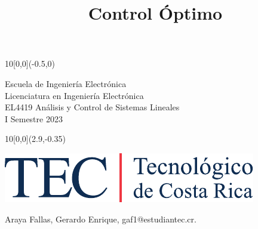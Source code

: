 \documentclass[12pt,letterpaper]{article}
\title{Control Óptimo}
\makeatletter
\newcommand{\EstudianteA}{Araya Fallas, Gerardo Enrique, gaf1@estudiantec.cr.}
\makeatother
\begin{document}
	
\graphicspath{{./}{./fig/}}


\begin{textblock}{10}[0,0](-0.5,0)
	\begin{flushleft}
		\large 
		Escuela de Ingeniería Electrónica \\
		Licenciatura en Ingeniería Electrónica \\
		EL4419 Análisis y Control de Sistemas Lineales\\
		I Semestre 2023
	\end{flushleft}
\end{textblock}

\begin{textblock}{10}[0,0](2.9,-0.35)
	\begin{flushright}
		\includegraphics[scale=0.8]{Firma_TEC-4.pdf}
	\end{flushright}
\end{textblock}

\begin{center}
	\vspace{2.0cm}
	\par\vspace{.3cm}
	{\LARGE\bf\color{tecAzul}{Control Optimo}}
	\par\vspace{.3cm}
	{\large{\EstudianteA} 
	\vspace{0.3cm}}
\end{center}




\end{document}
